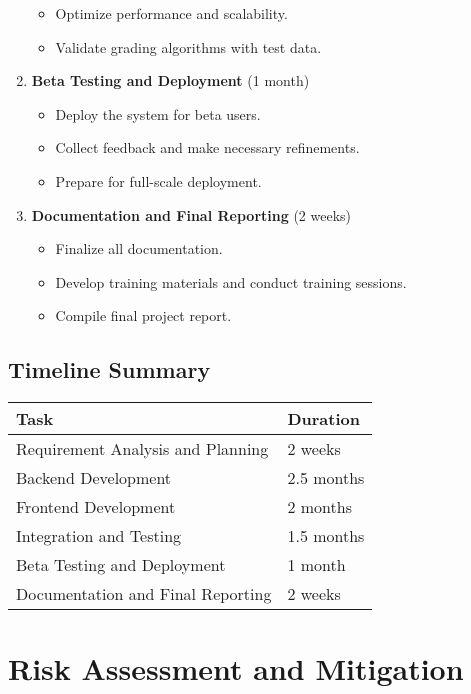 \documentclass[ms,twoside,print]{nuthesis}
\begin{document}
\begin{enumerate}
\begin{itemize}
        \item Optimize performance and scalability.
        \item Validate grading algorithms with test data.
    \end{itemize}
    \item \textbf{Beta Testing and Deployment} (1 month)
    \begin{itemize}
        \item Deploy the system for beta users.
        \item Collect feedback and make necessary refinements.
        \item Prepare for full-scale deployment.
    \end{itemize}
    \item \textbf{Documentation and Final Reporting} (2 weeks)
    \begin{itemize}
        \item Finalize all documentation.
        \item Develop training materials and conduct training sessions.
        \item Compile final project report.
    \end{itemize}
\end{enumerate}

\subsection{Timeline Summary}

\begin{center}
\begin{tabular}{ll}
\toprule
\textbf{Task} & \textbf{Duration} \\
\midrule
Requirement Analysis and Planning & 2 weeks \\
Backend Development & 2.5 months \\
Frontend Development & 2 months \\
Integration and Testing & 1.5 months \\
Beta Testing and Deployment & 1 month \\
Documentation and Final Reporting & 2 weeks \\
\bottomrule
\end{tabular}
\end{center}

\section{Risk Assessment and Mitigation}
\end{document}
